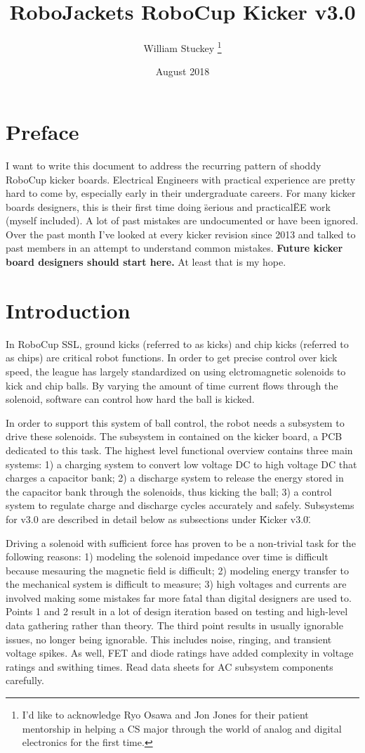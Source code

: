 \documentclass[12pt, letterpaper]{article}
\title{RoboJackets RoboCup Kicker v3.0}
\author{William Stuckey \thanks{I'd like to acknowledge Ryo Osawa and Jon Jones for their patient mentorship in helping a CS major through the world of analog and digital electronics for the first time.}}
\date{August 2018}
\begin{document}
 
\begin{titlepage}
\maketitle
\end{titlepage}

\section{Preface}

I want to write this document to address the recurring pattern of shoddy RoboCup kicker boards. Electrical Engineers with practical experience are pretty hard to come by, especially early in their undergraduate careers. For many kicker boards designers, this is their first time doing \"serious and practical\" EE work (myself included). A lot of past mistakes are undocumented or have been ignored. Over the past month I've looked at every kicker revision since 2013 and talked to past members in an attempt to understand common mistakes. \textbf{Future kicker board designers should start here.} At least that is my hope.

\section{Introduction}

In RoboCup SSL, ground kicks (referred to as kicks) and chip kicks (referred to as chips) are critical robot functions. In order to get precise control over kick speed, the league has largely standardized on using elctromagnetic solenoids to kick and chip balls. By varying the amount of time current flows through the solenoid, software can control how hard the ball is kicked. 

In order to support this system of ball control, the robot needs a subsystem to drive these solenoids. The subsystem in contained on the kicker board, a PCB dedicated to this task. The highest level functional overview contains three main systems: 1) a charging system to convert low voltage DC to high voltage DC that charges a capacitor bank; 2) a discharge system to release the energy stored in the capacitor bank through the solenoids, thus kicking the ball; 3) a control system to regulate charge and discharge cycles accurately and safely. Subsystems for v3.0 are described in detail below as subsections under \"Kicker v3.0\".

Driving a solenoid with sufficient force has proven to be a non-trivial task for the following reasons: 1) modeling the solenoid impedance over time is difficult because mesauring the magnetic field is difficult; 2) modeling energy transfer to the mechanical system is difficult to measure; 3) high voltages and currents are involved making some mistakes far more fatal than digital designers are used to. Points 1 and 2 result in a lot of design iteration based on testing and high-level data gathering rather than theory. The third point results in usually ignorable issues, no longer being ignorable. This includes noise, ringing, and transient voltage spikes. As well, FET and diode ratings have added complexity in voltage ratings and swithing times. Read data sheets for AC subsystem components carefully. 
\end{document}

